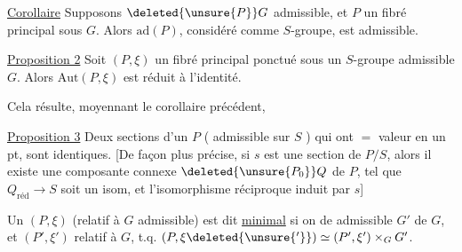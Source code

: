 \uline{Corollaire} Supposons $\deleted{\unsure{P}}G$ admissible, et $P$ un
fibré principal sous $G$. Alors $\mathrm{ad}(P)$, considéré
comme $S$-groupe, est admissible.

\uline{Proposition 2} Soit $(P,\xi)$ un fibré principal ponctué
sous un $S$-groupe admissible $G$. Alors
$\mathrm{Aut}(P,\xi)$ est réduit à l'identité.

Cela résulte, moyennant le corollaire précédent,

 \uline{Proposition 3} Deux sections d'un
$P$ ( admissible sur $S$ ) qui ont $=$ valeur
en un pt, sont identiques. [De façon
plus précise, si $s$ est une section de $P/S$,
alors il existe une composante connexe
$\deleted{\unsure{P_0}}Q$ de $P$, tel que $Q_{\text{réd}}\to S$ soit un
isom, et l'isomorphisme réciproque induit par $s$]

Un $(P,\xi)$  (relatif à $G$ admissible)
est dit \uline{minimal} si on 
de  admissible $G'$ de $G$, et
$(P',\xi')$ relatif à $G$, t.q. $(P,\xi\deleted{\unsure{'}})\simeq(P',\xi')\times_G G'$.
